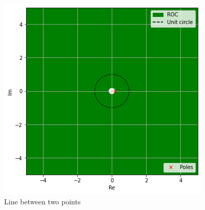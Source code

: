 \documentclass[journal,12pt,twocolumn]{IEEEtran}
\begin{document}
\begin{figure}[!h]
         \centering
         \includegraphics[width=\columnwidth]{fig_1.png}
         \caption{ Line between two points}
         \label{plot}
\end{figure}
\end{document}
